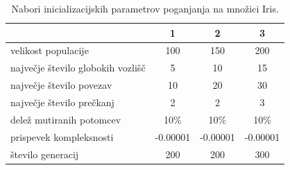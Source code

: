 \begin{table}[H]
    \begin{center}
        \begin{tabular}{||l c c c||}
            \hline
            & 1        & 2        & 3 \\ [0.5ex]
            \hline
            velikost populacije               & 100      & 150      & 200      \\
            \hline
            največje število globokih vozlišč & 5        & 10       & 15       \\
            \hline
            največje število povezav          & 10       & 20       & 30       \\
            \hline
            največje število prečkanj         & 2        & 2        & 3        \\
            \hline
            delež mutiranih potomcev          & 10\%     & 10\%     & 10\%     \\
            \hline
            prispevek kompleksnosti           & -0.00001 & -0.00001 & -0.00001 \\
            \hline
            število generacij                 & 200      & 200      & 300      \\
            \hline
        \end{tabular}
    \end{center}
    \caption{Nabori inicializacijskih parametrov poganjanja na množici Iris.}
    \label{tab:param_iris}
\end{table}

